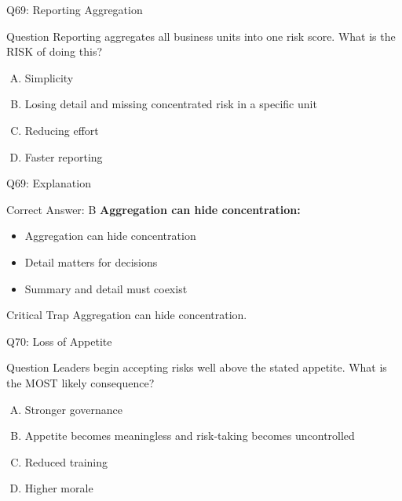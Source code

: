 \documentclass{beamer}
\begin{document}
	\begin{frame}{Q69: Reporting Aggregation}
		\begin{block}{Question}
			Reporting aggregates all business units into one risk score. What is the RISK of doing this?
		\end{block}
		\begin{enumerate}[(A)]
			\item Simplicity
			\item Losing detail and missing concentrated risk in a specific unit
			\item Reducing effort
			\item Faster reporting
		\end{enumerate}
	\end{frame}
	
	\begin{frame}{Q69: Explanation}
		\begin{block}{Correct Answer: B}
			\textbf{Aggregation can hide concentration:}
			\begin{itemize}
				\item Aggregation can hide concentration
				\item Detail matters for decisions
				\item Summary and detail must coexist
			\end{itemize}
		\end{block}
		\begin{alertblock}{Critical Trap}
			Aggregation can hide concentration.
		\end{alertblock}
	\end{frame}
	
	\begin{frame}{Q70: Loss of Appetite}
		\begin{block}{Question}
			Leaders begin accepting risks well above the stated appetite. What is the MOST likely consequence?
		\end{block}
		\begin{enumerate}[(A)]
			\item Stronger governance
			\item Appetite becomes meaningless and risk-taking becomes uncontrolled
			\item Reduced training
			\item Higher morale
		\end{enumerate}
	\end{frame}
	
\end{document}
